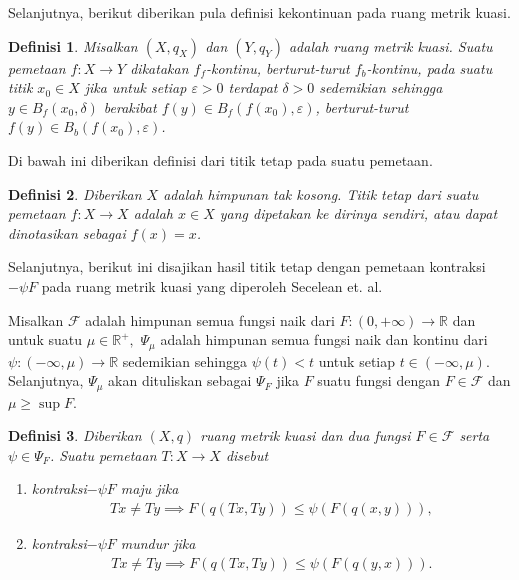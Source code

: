 \documentclass[journal]{IEEEtran}
\newtheorem{defn}{Definisi}[section]
\theoremstyle{definition}
\theoremstyle{definition}
\theoremstyle{plain}
\newcommand{\R}{\mathbb{R}}
\begin{document}
Selanjutnya, berikut diberikan pula definisi kekontinuan pada ruang metrik kuasi.
\begin{defn}
    \cite{JuliaCollins2007} Misalkan $(X,q_X)$ dan $(Y,q_Y)$ adalah ruang metrik kuasi. Suatu pemetaan $f:X\rightarrow Y$ dikatakan $f_f$-kontinu, berturut-turut $f_b$-kontinu, pada suatu titik $x_0\in X$ jika untuk setiap $\varepsilon>0$ terdapat $\delta>0$ sedemikian sehingga $y\in B_f(x_0,\delta)$ berakibat $f(y)\in B_f(f(x_0),\varepsilon)$, berturut-turut $f(y)\in B_b(f(x_0),\varepsilon)$.
\end{defn}

Di bawah ini diberikan definisi dari titik tetap pada suatu pemetaan.
\begin{defn}
    \cite{kreyszig} Diberikan $X$ adalah himpunan tak kosong. Titik tetap dari suatu pemetaan $f:X\rightarrow X$ adalah $x\in X$ yang dipetakan ke dirinya sendiri, atau dapat dinotasikan sebagai $f(x)=x$.
\end{defn}
Selanjutnya, berikut ini disajikan hasil titik tetap dengan pemetaan kontraksi$-\psi F$ pada ruang metrik kuasi yang diperoleh Secelean et. al.

Misalkan $\mathcal{F}$ adalah himpunan semua fungsi naik dari $F:(0,+\infty)\rightarrow \R$ dan untuk suatu $\mu\in \R^+,$ $\Psi_{\mu}$ adalah himpunan semua fungsi naik dan kontinu dari $\psi:(-\infty, \mu)\rightarrow\R$ sedemikian sehingga $\psi(t)<t$ untuk setiap $t\in (-\infty,\mu)$. Selanjutnya, $\Psi_{\mu}$ akan dituliskan sebagai $\Psi_F$ jika $F$ suatu fungsi dengan $F\in \mathcal{F}$ dan $\mu\geq \sup F$.

\begin{defn}\label{KontraksipsiF}
    \cite{Secelean2019} Diberikan $(X,q)$ ruang metrik kuasi dan dua fungsi $F\in\mathcal{F}$ serta $\psi\in \Psi_F$. Suatu pemetaan $T:X\rightarrow X$ disebut 
    \begin{enumerate}
        \item[(i)] kontraksi$-\psi F$ maju jika 
                    \begin{align}
                        Tx\neq Ty \implies F(q(Tx,Ty))\leq \psi(F(q(x,y))),  \label{eq:kontraksipsiFkuasimaju}
                    \end{align}
        \item[(ii)] kontraksi$-\psi F$ mundur jika 
                    \begin{align}
                        Tx\neq Ty \implies F(q(Tx,Ty))\leq \psi(F(q(y,x))). \label{eq:kontraksipsiFkuasimundur}
                    \end{align}
    \end{enumerate}
\end{defn}
\end{document}
